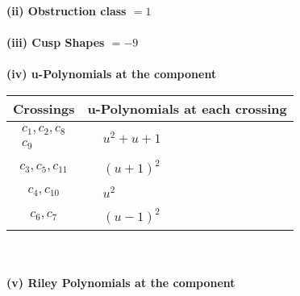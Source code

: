 \documentclass[1p]{elsarticle_modified}
\theoremstyle{definition}
\begin{document}
\flushleft \textbf{(ii) Obstruction class $= 1$}\\~\\
\flushleft \textbf{(iii) Cusp Shapes $= -9$}\\~\\
\newpage\renewcommand{\arraystretch}{1}
\flushleft \textbf{(iv) u-Polynomials at the component}\newline \\
\begin{tabular}{m{50pt}|m{274pt}}
Crossings & \hspace{64pt}u-Polynomials at each crossing \\
\hline $$\begin{aligned}c_{1},c_{2},c_{8}\\c_{9}\end{aligned}$$&$\begin{aligned}
&u^2+u+1
\end{aligned}$\\
\hline $$\begin{aligned}c_{3},c_{5},c_{11}\end{aligned}$$&$\begin{aligned}
&(u+1)^2
\end{aligned}$\\
\hline $$\begin{aligned}c_{4},c_{10}\end{aligned}$$&$\begin{aligned}
&u^2
\end{aligned}$\\
\hline $$\begin{aligned}c_{6},c_{7}\end{aligned}$$&$\begin{aligned}
&(u-1)^2
\end{aligned}$\\
\hline
\end{tabular}\\~\\
\newpage\renewcommand{\arraystretch}{1}
\flushleft \textbf{(v) Riley Polynomials at the component}\newline \\
\end{document}
